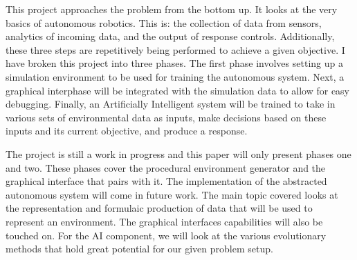\documentclass[]{report}
\begin{document}
This project approaches the problem from the bottom up. It looks at the very basics of autonomous robotics. This is: the collection of data from sensors, analytics of incoming data, and the output of response controls. Additionally, these three steps are repetitively being performed to achieve a given objective. I have broken this project into three phases. The first phase involves setting up a simulation environment to be used for training the autonomous system. Next, a graphical interphase will be integrated with the simulation data to allow for easy debugging. Finally, an Artificially Intelligent system will be trained to take in various sets of environmental data as inputs, make decisions based on these inputs and its current objective, and produce a response.

The project is still a work in progress and this paper will only present phases one and two. These phases cover the procedural environment generator and the graphical interface that pairs with it. The implementation of the abstracted autonomous system will come in future work. The main topic covered looks at the representation and formulaic production of data that will be used to represent an environment. The graphical interfaces capabilities will also be touched on. For the AI component, we will look at the various evolutionary methods that hold great potential for our given problem setup.
\end{document}
